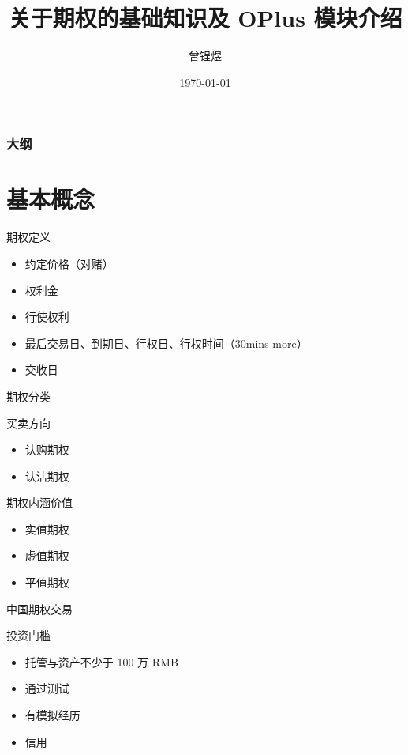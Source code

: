 \documentclass[12pt]{ctexbeamer}	%
\title[期权知识分享]{关于期权的基础知识及 OPlus 模块介绍}	%
\author[Zengyu Zeng]{曾锃煜}
\institute[Hundsun]{资管，研发四部}	%
\date{\today}
\begin{document}
\begin{frame}
\titlepage
\end{frame}


\begin{frame}
\frametitle{大纲}
\tableofcontents
\end{frame}


\section{基本概念}

\begin{frame}{期权定义}
  \begin{itemize} %
    \item 约定价格（对赌）
    \item 权利金
    \item 行使权利
    \item 最后交易日、到期日、行权日、行权时间（30mins more）
    \item 交收日
  \end{itemize}
\end{frame}

\begin{frame}{期权分类}
  \begin{block}{买卖方向}
    \begin{itemize}
      \item 认购期权
      \item 认沽期权
    \end{itemize}
  \end{block}
  \begin{block}{期权内涵价值}
    \begin{itemize}
      \item 实值期权
      \item 虚值期权
      \item 平值期权
    \end{itemize}
  \end{block}
\end{frame}

\begin{frame}{中国期权交易}
  \begin{block}{投资门槛}
    \begin{itemize}
      \item 托管与资产不少于 100 万 RMB
      \item 通过测试
      \item 有模拟经历
      \item 信用
    \end{itemize}
  \end{block}
\end{frame}
\end{document}

